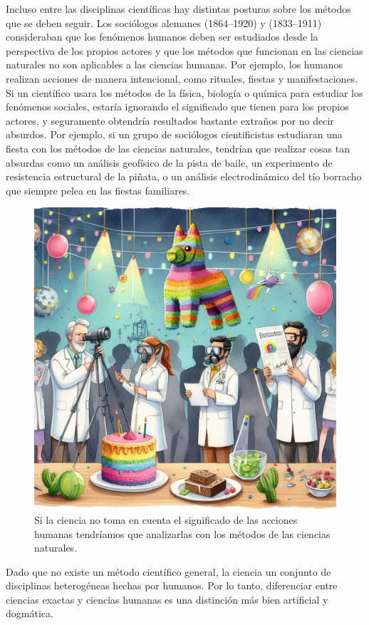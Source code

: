 Incluso entre las disciplinas científicas hay distintas posturas sobre los
métodos que se deben seguir.
Los sociólogos alemanes  (1864--1920) y
 (1833--1911) consideraban que los
fenómenos humanos deben ser estudiados desde la perspectiva de los propios
actores y que los métodos que funcionan en las ciencias naturales no son
aplicables a las ciencias humanas.
Por ejemplo, los humanos realizan acciones de manera intencional, como rituales,
fiestas y manifestaciones.
Si un científico usara los métodos de la física, biología o química para
estudiar los fenómenos sociales, estaría ignorando el significado que tienen
para los propios actores, y seguramente obtendría resultados bastante extraños
por no decir absurdos.
Por ejemplo, si un grupo de sociólogos cientificistas estudiaran una fiesta con
los métodos de las ciencias naturales, tendrían que realizar cosas tan absurdas
como un análisis geofísico de la pista de baile, un experimento de resistencia
estructural de la piñata, o un análisis electrodinámico del tío borracho que
siempre pelea en las fiestas familiares.

\begin{figure}[ht]
    \centering
    \includegraphics[width=0.8\linewidth]{img/fiesta}
    \caption{Si la ciencia no toma en cuenta el significado de las acciones
        humanas tendríamos que analizarlas con los métodos de las ciencias
        naturales.}
\end{figure}

Dado que no existe un método científico general, la ciencia un conjunto de
disciplinas heterogéneas hechas por humanos.
Por lo tanto, diferenciar entre ciencias exactas y ciencias humanas es una
distinción más bien artificial y dogmática.


